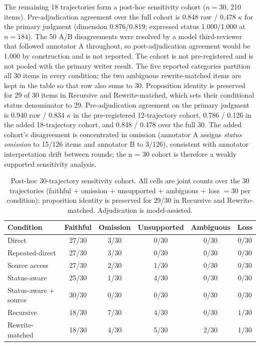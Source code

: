 \documentclass[11pt]{article}
\begin{document}
The remaining 18 trajectories form a post-hoc sensitivity cohort ($n = 30$,
210 items). Pre-adjudication agreement over the full cohort is 0.848 raw /
0.478 $\kappa$ for the primary judgment (dimension 0.876/0.819; expressed
status 1.000/1.000 at $n = 184$). The 50 A/B disagreements were resolved by a
model third-reviewer that followed annotator A throughout, so post-adjudication
agreement would be 1.000 by construction and is not reported. The cohort is not
pre-registered and is not pooled with the primary writer result. The five
reported categories partition all 30 items in every condition; the two
ambiguous rewrite-matched items are kept in the table so that row also sums to
30. Proposition identity is preserved for 29 of 30 items in Recursive and
Rewrite-matched, which sets their conditional status denominator to 29.
Pre-adjudication agreement on the primary judgment is 0.940 raw / 0.834
$\kappa$ in the pre-registered 12-trajectory cohort, 0.786 / 0.126 in the
added 18-trajectory cohort, and 0.848 / 0.478 over the full 30. The added
cohort's disagreement is concentrated in omission (annotator A assigns
\emph{status omission} to 15/126 items and annotator B to 3/126), consistent
with annotator interpretation drift between rounds; the n = 30 cohort is
therefore a weakly supported sensitivity analysis.

\begin{table}[h]
\centering
\small
\begin{tabular}{lccccc}
\toprule
Condition & Faithful & Omission & Unsupported & Ambiguous & Loss \\
\midrule
Direct & 27/30 & 3/30 & 0/30 & 0/30 & 0/30 \\
Repeated-direct & 27/30 & 3/30 & 0/30 & 0/30 & 0/30 \\
Source access & 27/30 & 2/30 & 1/30 & 0/30 & 0/30 \\
Status-aware & 25/30 & 1/30 & 4/30 & 0/30 & 0/30 \\
Status-aware + source & 30/30 & 0/30 & 0/30 & 0/30 & 0/30 \\
Recursive & 18/30 & 7/30 & 4/30 & 0/30 & 1/30 \\
Rewrite-matched & 18/30 & 4/30 & 5/30 & 2/30 & 1/30 \\
\bottomrule
\end{tabular}
\caption{Post-hoc 30-trajectory sensitivity cohort. All cells are joint counts
over the 30 trajectories (faithful $+$ omission $+$ unsupported $+$ ambiguous
$+$ loss $=30$ per condition); proposition identity is preserved for 29/30 in
Recursive and Rewrite-matched. Adjudication is model-assisted.}
\label{tab:repl30}
\end{table}
\end{document}
